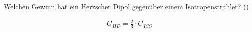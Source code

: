 \begin{question}[section=,name={},difficulty=,quantity=,type=thr,tags={20160310}]
	Welchen Gewinn hat ein Herzscher Dipol gegenüber einem Isotropenstrahler? ()
	
\end{question}
\begin{solution}
	\begin{align}
		G_{HD} = \frac{2}{3}\cdot G_{ISO}
	\end{align}
\end{solution}